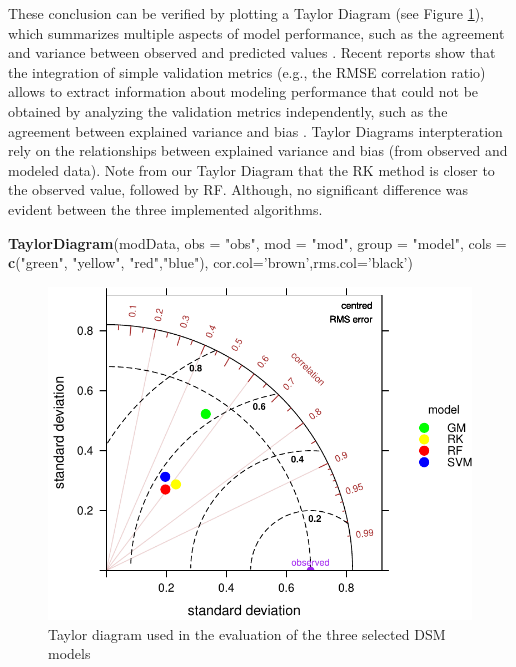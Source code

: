 \documentclass[10pt,b5paper,]{book}
\newenvironment{Shaded}{\begin{snugshade}}{\end{snugshade}}
\newcommand{\DataTypeTok}[1]{\textcolor[rgb]{0.13,0.29,0.53}{#1}}
\newcommand{\KeywordTok}[1]{\textcolor[rgb]{0.13,0.29,0.53}{\textbf{#1}}}
\newcommand{\NormalTok}[1]{#1}
\newcommand{\StringTok}[1]{\textcolor[rgb]{0.31,0.60,0.02}{#1}}
\theoremstyle{definition}
\theoremstyle{definition}
\theoremstyle{definition}
\theoremstyle{remark}
\begin{document}
These conclusion can be verified by plotting a Taylor Diagram (see
Figure \ref{fig:taylor}), which summarizes multiple aspects of model
performance, such as the agreement and variance between observed and
predicted values \citep{taylor2001summarizing}. Recent reports show that
the integration of simple validation metrics (e.g., the RMSE correlation
ratio) allows to extract information about modeling performance that
could not be obtained by analyzing the validation metrics independently,
such as the agreement between explained variance and bias
\citep{guevara_2018, nussbaum2018evaluation}. Taylor Diagrams
interpteration rely on the relationships between explained variance and
bias (from observed and modeled data). Note from our Taylor Diagram that
the RK method is closer to the observed value, followed by RF. Although,
no significant difference was evident between the three implemented
algorithms.

\begin{Shaded}
\begin{Highlighting}[]
\KeywordTok{TaylorDiagram}\NormalTok{(modData, }\DataTypeTok{obs =} \StringTok{"obs"}\NormalTok{, }\DataTypeTok{mod =} \StringTok{"mod"}\NormalTok{, }\DataTypeTok{group =} \StringTok{"model"}\NormalTok{,}
\DataTypeTok{cols =} \KeywordTok{c}\NormalTok{(}\StringTok{"green"}\NormalTok{, }\StringTok{"yellow"}\NormalTok{, }\StringTok{"red"}\NormalTok{,}\StringTok{"blue"}\NormalTok{), }\DataTypeTok{cor.col=}\StringTok{'brown'}\NormalTok{,}\DataTypeTok{rms.col=}\StringTok{'black'}\NormalTok{)}
\end{Highlighting}
\end{Shaded}

\begin{figure}
\centering
\includegraphics{SOCMapping_files/figure-latex/taylor-1.pdf}
\caption{\label{fig:taylor}Taylor diagram used in the evaluation of the
three selected DSM models}
\end{figure}
\end{document}

